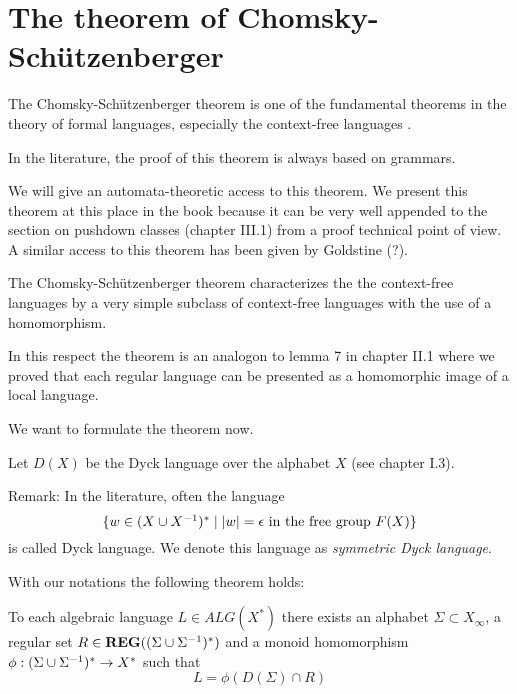 \section{The theorem of Chomsky-Schützenberger}

The Chomsky-Schützenberger theorem is one of the fundamental theorems in the
theory of formal languages, especially the context-free languages \cite{ChSch}.

In the literature, the proof of this theorem is always based on grammars.

We will give an automata-theoretic access to this theorem. We present this
theorem at this place in the book because it can be very well appended to the
section on pushdown classes (chapter III.1) from a proof technical point of
view. A similar access to this theorem has been given by Goldstine
\cite{Goldstine77} (?).

The Chomsky-Schützenberger theorem characterizes the the context-free languages
by a very simple subclass of context-free languages with the use of a
homomorphism.

In this respect the theorem is an analogon to lemma 7 in chapter II.1 where we
proved that each regular language can be presented as a homomorphic image of a
local language.

We want to formulate the theorem now.

Let $D(X)$ be the Dyck language over the alphabet $X$ (see chapter I.3).

Remark: In the literature, often the language
\[ \mbox{$\{w\in (X \cup {X}^{-1})^* \mid |w|= \epsilon\text{ in the free group
}F(X)\}$} 
\] 
is called Dyck language. We denote this language as {\em symmetric Dyck
language}.

With our notations the following theorem holds:
\begin{theorem}
To each algebraic language $L\in ALG(X^*)$ there exists an alphabet $\Sigma
\subset X_\infty$, a regular set $R\in \mbox{{\bf REG}}((\Sigma \cup {\Sigma}^{-1})^*)$ and a monoid
homomorphism $\phi: (\Sigma \cup {\Sigma}^{-1})^* \to X^*$ such that
\[ L = \phi(D(\Sigma)\cap R) \]
\end{theorem}

